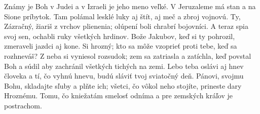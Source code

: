 Známy je Boh v Judei
a v Izraeli je jeho meno veľké.
\versseparator
V Jeruzaleme má stan
a na Sione príbytok.
\versseparator
Tam polámal lesklé luky
aj štít, aj meč a zbroj vojnovú.
\versseparator
Ty, Zázračný, žiariš
z vrchov plienenia;
olúpení boli chrabrí bojovníci.
\versseparator
A teraz spia svoj sen,
ochabli ruky všetkých hrdinov.
\versseparator
Bože Jakubov, keď si ty pohrozil,
zmeraveli jazdci aj kone.
\versseparator
Si hrozný; kto sa môže vzoprieť proti tebe,
keď sa rozhneváš?
\versseparator
Z neba si vyniesol rozsudok;
zem sa zatriasla a zatíchla,
\versseparator
keď povstal Boh a súdil
aby zachránil všetkých tichých na zemi.
\versseparator
Lebo teba oslávi aj hnev človeka
a tí, čo vyhnú hnevu, budú sláviť tvoj sviatočný deň.
\versseparator
Pánovi, svojmu Bohu, skladajte sľuby a plňte ich;
všetci, čo vôkol neho stojíte, prineste dary Hroznému.
\versseparator
Tomu, čo kniežatám smelosť odníma
a pre zemských kráľov je postrachom.